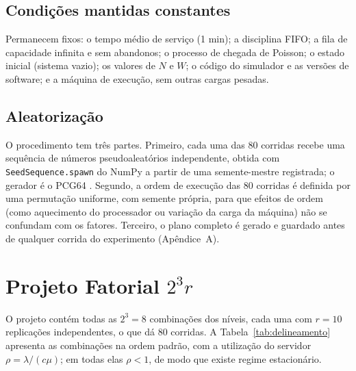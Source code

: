 \documentclass[stu,a4paper,12pt,floatsintext,biblatex]{apa7}
\begin{document}
\subsection{Condições mantidas constantes}
Permanecem fixos: o tempo médio de serviço (1 min); a disciplina FIFO; a fila de capacidade infinita e sem abandonos; o processo de chegada de Poisson; o estado inicial (sistema vazio); os valores de $N$ e $W$; o código do simulador e as versões de software; e a máquina de execução, sem outras cargas pesadas.

\subsection{Aleatorização}
O procedimento tem três partes.
Primeiro, cada uma das 80 corridas recebe uma sequência de números pseudoaleatórios independente, obtida com \texttt{SeedSequence.spawn} do NumPy a partir de uma semente-mestre registrada; o gerador é o PCG64 \parencite{oneill2014}.
Segundo, a ordem de execução das 80 corridas é definida por uma permutação uniforme, com semente própria, para que efeitos de ordem (como aquecimento do processador ou variação da carga da máquina) não se confundam com os fatores.
Terceiro, o plano completo é gerado e guardado antes de qualquer corrida do experimento (Apêndice~A).

\section{Projeto Fatorial \texorpdfstring{$2^3 r$}{2\textasciicircum 3 r}}
\label{sec:projeto}
O projeto contém todas as $2^3 = 8$ combinações dos níveis, cada uma com $r = 10$ replicações independentes, o que dá 80 corridas.
A Tabela~\ref{tab:delineamento} apresenta as combinações na ordem padrão, com a utilização do servidor $\rho = \lambda / (c\mu)$; em todas elas $\rho < 1$, de modo que existe regime estacionário.

\begin{table}[H]
\caption{Combinações experimentais do projeto $2^3$ ($r = 10$ replicações por combinação)}
\label{tab:delineamento}
\small

\end{table}
\end{document}
